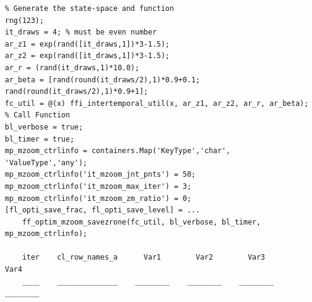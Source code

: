 \documentclass[
]{book}
\begin{document}
\begin{verbatim}
% Generate the state-space and function
rng(123);
it_draws = 4; % must be even number
ar_z1 = exp(rand([it_draws,1])*3-1.5);
ar_z2 = exp(rand([it_draws,1])*3-1.5);
ar_r = (rand(it_draws,1)*10.0);
ar_beta = [rand(round(it_draws/2),1)*0.9+0.1; rand(round(it_draws/2),1)*0.9+1]; 
fc_util = @(x) ffi_intertemporal_util(x, ar_z1, ar_z2, ar_r, ar_beta);
% Call Function
bl_verbose = true;
bl_timer = true;
mp_mzoom_ctrlinfo = containers.Map('KeyType','char', 'ValueType','any');
mp_mzoom_ctrlinfo('it_mzoom_jnt_pnts') = 50;
mp_mzoom_ctrlinfo('it_mzoom_max_iter') = 3;
mp_mzoom_ctrlinfo('it_mzoom_zm_ratio') = 0;
[fl_opti_save_frac, fl_opti_save_level] = ...
    ff_optim_mzoom_savezrone(fc_util, bl_verbose, bl_timer, mp_mzoom_ctrlinfo);

    iter    cl_row_names_a      Var1        Var2        Var3        Var4  
    ____    ______________    ________    ________    ________    ________


\end{verbatim}
\end{document}
